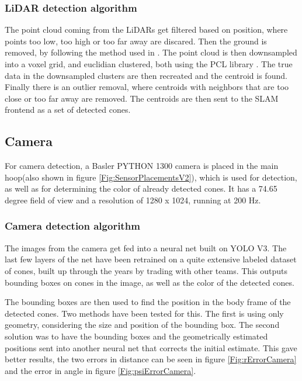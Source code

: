 \subsubsection{LiDAR detection algorithm}
The point cloud coming from the LiDARs get filtered based on position, where points too low, too high or too far away are discared. Then the ground is removed, by following the method used in \cite{GroundRemoval}. The point cloud is then downsampled into a voxel grid, and euclidian clustered, both using the PCL library \cite{PCL}. The true data in the downsampled clusters are then recreated and the centroid is found. Finally there is an outlier removal, where centroids with neighbors that are too close or too far away are removed. The centroids are then sent to the SLAM frontend as a set of detected cones.

\subsection{Camera}
For camera detection, a Basler PYTHON 1300 camera is placed in the main hoop(also shown in figure \ref{Fig:SensorPlacementsV2}), which is used for detection, as well as for determining the color of already detected cones. It has a 74.65 degree field of view and a resolution of 1280 x 1024, running at 200 Hz. 

\subsubsection{Camera detection algorithm}
The images from the camera get fed into a neural net built on YOLO V3\cite{YOLOV3}. The last few layers of the net have been retrained on a quite extensive labeled dataset of cones, built up through the years by trading with other teams. This outputs bounding boxes on cones in the image, as well as the color of the detected cones. 

The bounding boxes are then used to find the position in the body frame of the detected cones. Two methods have been tested for this. The first is using only geometry, considering the size and position of the bounding box. The second solution was to have the bounding boxes and the geometrically estimated positions sent into another neural net that corrects the initial estimate. This gave better results, the two errors in distance can be seen in figure \ref{Fig:rErrorCamera} and the error in angle in figure \ref{Fig:psiErrorCamera}.

